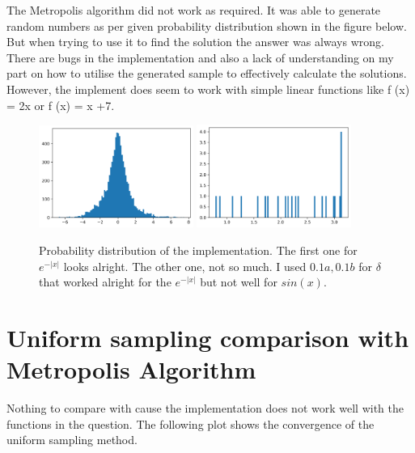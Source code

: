 \documentclass{article}
\begin{document}
\noindent 
The Metropolis algorithm did not work as required. It was able to generate random
numbers as per given probability distribution shown in the figure below. But 
when trying to use it to find the solution the answer was always wrong. There are 
bugs in the implementation and also a lack of understanding on my part on how to utilise
the generated sample to effectively calculate the solutions. However, the implement 
does seem to work with simple linear functions like f (x) = 2x or f (x) = x +7.

\begin{figure}[H]
    \centering
    \includegraphics[width=0.45\textwidth]{q-5a.png}
    \includegraphics[width=0.45\textwidth]{q-5b.png}
    \caption{Probability distribution of the implementation. The first one for $e^{-|x|}$ looks 
    alright. The other one, not so much. I used $0.1a, 0.1b$ for $\delta$ that worked alright
    for the $e^{-|x|}$ but not well for $sin(x)$.}
    \label{fig:q-5}
 \end{figure}

\section{Uniform sampling comparison with Metropolis Algorithm}

Nothing to compare with cause the implementation does not work well with the functions in the 
question. The following plot shows the convergence of the uniform sampling method. 
\end{document}
